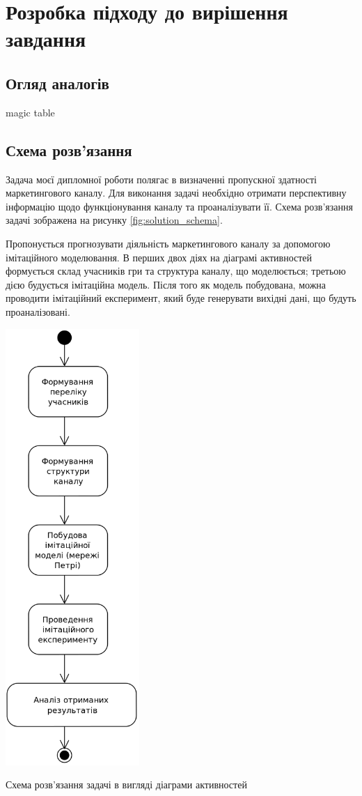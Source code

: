 \section{Розробка підходу до вирішення завдання}

\subsection{Огляд аналогів}
magic table

\subsection{Схема розв’язання}
Задача моєї дипломної роботи полягає в визначенні пропускної здатності маркетингового каналу. Для виконання задачі необхідно отримати перспективну інформацію щодо функціонування каналу та проаналізувати її. Схема розв’язання задачі зображена на рисунку \ref{fig:solution_schema}.

Пропонується прогнозувати діяльність маркетингового каналу за допомогою імітаційного моделювання. В перших двох діях на діаграмі активностей формується склад учасників гри та структура каналу, що моделюється; третьою дією будується імітаційна модель. Після того як модель побудована, можна проводити імітаційний експеримент, який буде генерувати вихідні дані, що будуть проаналізовані.

            \begin{stdfigure}
                \includegraphics[width=2in]{images/uml_act_solution_schema.png}
                \caption{Схема розв’язання задачі в вигляді діаграми активностей}
                \label{fig:solution_schema}
            \end{stdfigure}   
